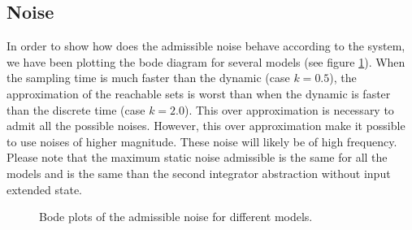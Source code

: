 \subsection{Noise}
%	
%	
%


In order to show how does the admissible noise behave according to the system, we have been plotting the bode diagram for several models (see figure \ref{fig:bode_gain}).
When the sampling time is much faster than the dynamic (case $k=0.5$), the approximation of the reachable sets is worst than when the dynamic is faster than the discrete time (case $k=2.0$). This over approximation is necessary to admit all the possible noises. However, this over approximation make it possible to use noises of higher magnitude. These noise will likely be of high frequency.
Please note that the maximum static noise admissible is the same for all the models and is the same than the second integrator abstraction without input extended state.

\begin{figure}

\caption{Bode plots of the admissible noise for different models.}
\label{fig:bode_gain}
\end{figure}


